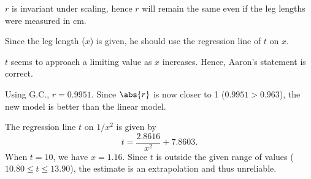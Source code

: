 \begin{solution}
    \begin{ppart}
        $r$ is invariant under scaling, hence $r$ will remain the same even if the leg lengths were measured in cm.
    \end{ppart}
    \begin{ppart}
        Since the leg length ($x$) is given, he should use the regression line of $t$ on $x$.
    \end{ppart}
    \begin{ppart}
        \begin{figure}[H]
            \centering
        \end{figure}
    \end{ppart}
    \begin{ppart}
        $t$ seems to approach a limiting value as $x$ increases. Hence, Aaron's statement is correct.
    \end{ppart}
    \begin{ppart}
        \begin{psubpart}
            Using G.C., $r = 0.9951$. Since $\abs{r}$ is now closer to 1 ($0.9951 > 0.963$), the new model is better than the linear model.
        \end{psubpart}
        \begin{psubpart}
            The regression line $t$ on $1/x^2$ is given by \[t = \frac{2.8616}{x^2} + 7.8603.\] When $t = 10$, we have $x = 1.16$. Since $t$ is outside the given range of values ($10.80 \leq t \leq 13.90$), the estimate is an extrapolation and thus unreliable.
        \end{psubpart}
    \end{ppart}
\end{solution}